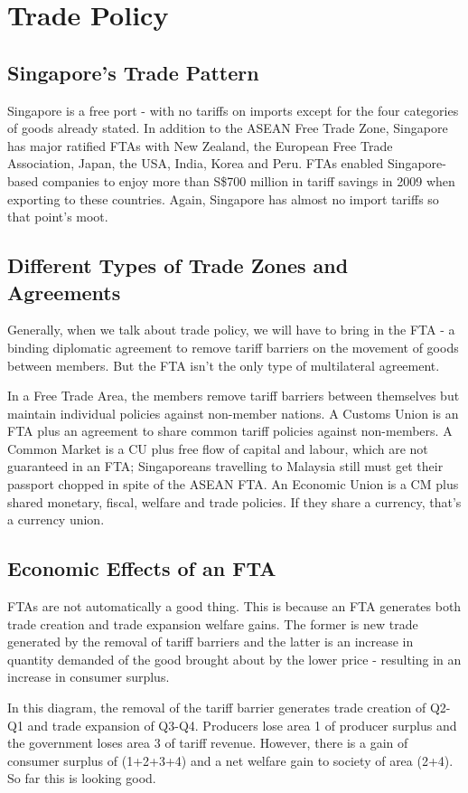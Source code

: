 \section{Trade Policy}
\subsection{Singapore's Trade Pattern}
Singapore is a free port - with no tariffs on imports except for the four categories of goods already stated. In addition to the ASEAN Free Trade Zone, Singapore has major ratified FTAs with New Zealand, the European Free Trade Association, Japan, the USA, India, Korea and Peru. FTAs enabled Singapore-based companies to enjoy more than S\$700 million in tariff savings in 2009 when exporting to these countries. Again, Singapore has almost no import tariffs so that point's moot.
\subsection{Different Types of Trade Zones and Agreements}
Generally, when we talk about trade policy, we will have to bring in the FTA - a binding diplomatic agreement to remove tariff barriers on the movement of goods between members. But the FTA isn't the only type of multilateral agreement. 

In a Free Trade Area, the members remove tariff barriers between themselves but maintain individual policies against non-member nations. A Customs Union is an FTA plus an agreement to share common tariff policies against non-members. A Common Market is a CU plus free flow of capital and labour, which are not guaranteed in an FTA; Singaporeans travelling to Malaysia still must get their passport chopped in spite of the ASEAN FTA. An Economic Union is a CM plus shared monetary, fiscal, welfare and trade policies. If they share a currency, that's a currency union.
\subsection{Economic Effects of an FTA}
FTAs are not automatically a good thing. This is because an FTA generates both trade creation and trade expansion welfare gains. The former is new trade generated by the removal of tariff barriers and the latter is an increase in quantity demanded of the good brought about by the lower price - resulting in an increase in consumer surplus.

In this diagram, the removal of the tariff barrier generates trade creation of Q2-Q1 and trade expansion of Q3-Q4. Producers lose area 1 of producer surplus and the government loses area 3 of tariff revenue. However, there is a gain of consumer surplus of (1+2+3+4) and a net welfare gain to society of area (2+4). So far this is looking good.

